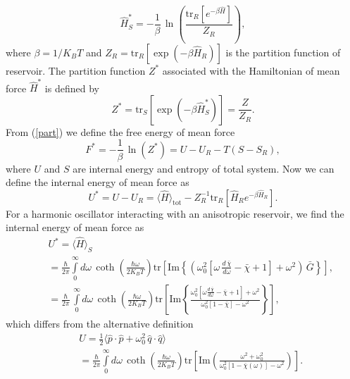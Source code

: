 \documentclass[preprint,showpacs,showkeys,groupedaddress,superscriptaddress]{revtex4}
\begin{document}
\begin{equation}
\hat H_S^* =- \frac{1}{\beta}\,\ln \left( \frac{\mbox{tr}_R [e^{-\beta \hat H}]}{Z_R} \right),
 \end{equation}
where $\beta=1/K_B T$ and $Z_R  = \mbox{tr}_R [\exp (-\beta \hat H_R )]$ is the partition function of reservoir. The partition function $Z^*$ associated with the Hamiltonian of mean force $\hat H^*$ is defined by
\begin{equation}\label{part}
Z^* = \mbox{tr}_S [\exp (-\beta \hat H_S^* )] = \frac{Z}{{Z_R }}.
\end{equation}
From (\ref{part}) we define the free energy of mean force
\begin{equation}
F^*  =  -\frac{1}{\beta}\,\ln (Z^* )= U - U_R - T(S - S_R ),
\end{equation}
where $U$ and $S$ are internal energy and entropy of total system. Now we can define the internal energy of mean force as
\begin{equation}\label{internal}
U^* = U- U_R  = \langle {\hat H}\rangle_{\mbox{tot}} - Z_R^{-1} \mbox{tr}_R [\hat H_R e^{-\beta \hat H_R }].
\end{equation}
For a harmonic oscillator interacting with an anisotropic reservoir, we find the internal energy of mean force as
\begin{eqnarray}
&& U^* =\langle \hat H \rangle_S \nonumber\\
&& = \frac{\hbar}{2\pi} \int\limits_0^\infty d\omega\, \coth \left(\frac{\hbar \omega}{2K_B T} \right)\mbox{tr}\left[\mbox{Im}
\left\{\left(\omega_0^2 \left[\omega\,\frac{d\,\bar{\chi}}{d\omega} - \bar{\chi} + 1 \right] + \omega^2\right) \,\bar{G}\right\} \right],\nonumber\\
&&= \frac{\hbar}{2\pi}\,\int\limits_0^\infty d\omega\, \coth \left(\frac{\hbar \omega}{2K_B T} \right)\mbox{tr}\left[\mbox{Im}
\left\{\frac{\omega_0^2 \left[\omega\frac{d\,\bar{\chi}}{d\omega}- \bar{\chi}+ 1 \right] + \omega^2 }{\omega_0^2
[1-\bar{\chi}]-\omega^2}\right\}\right],
\end{eqnarray}
which differs from the alternative definition \cite{Gelin}
\begin{eqnarray}
&& U =\frac{1}{2} \langle \hat p\cdot\hat p + \omega _0^2 \,\hat q\cdot\hat q \rangle\nonumber\\
&& = \frac{\hbar}{2\pi}\int\limits_0^\infty d\omega\,
\coth \left(\frac{\hbar \omega}{2K_B T}\right)\mbox{tr}\left[\mbox{Im}\left(\frac{\omega^2 +\omega _0^2}{\omega_0^2 \left[ 1 - \bar{\chi} (\omega) \right] - \omega^2 } \right)\right].
\end{eqnarray}
\end{document}
